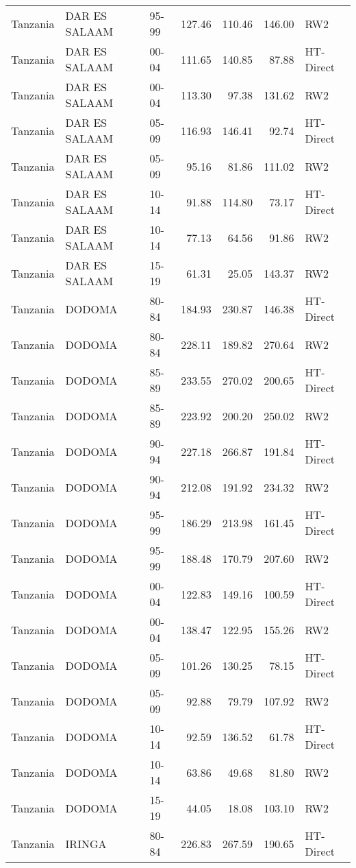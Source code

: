 \begin{longtable}{lllrrrl}
  Tanzania & DAR ES SALAAM & 95-99 & 127.46 & 110.46 & 146.00 & RW2 \\ 
  Tanzania & DAR ES SALAAM & 00-04 & 111.65 & 140.85 & 87.88 & HT-Direct \\ 
  Tanzania & DAR ES SALAAM & 00-04 & 113.30 & 97.38 & 131.62 & RW2 \\ 
  Tanzania & DAR ES SALAAM & 05-09 & 116.93 & 146.41 & 92.74 & HT-Direct \\ 
  Tanzania & DAR ES SALAAM & 05-09 & 95.16 & 81.86 & 111.02 & RW2 \\ 
  Tanzania & DAR ES SALAAM & 10-14 & 91.88 & 114.80 & 73.17 & HT-Direct \\ 
  Tanzania & DAR ES SALAAM & 10-14 & 77.13 & 64.56 & 91.86 & RW2 \\ 
  Tanzania & DAR ES SALAAM & 15-19 & 61.31 & 25.05 & 143.37 & RW2 \\ 
  Tanzania & DODOMA & 80-84 & 184.93 & 230.87 & 146.38 & HT-Direct \\ 
  Tanzania & DODOMA & 80-84 & 228.11 & 189.82 & 270.64 & RW2 \\ 
  Tanzania & DODOMA & 85-89 & 233.55 & 270.02 & 200.65 & HT-Direct \\ 
  Tanzania & DODOMA & 85-89 & 223.92 & 200.20 & 250.02 & RW2 \\ 
  Tanzania & DODOMA & 90-94 & 227.18 & 266.87 & 191.84 & HT-Direct \\ 
  Tanzania & DODOMA & 90-94 & 212.08 & 191.92 & 234.32 & RW2 \\ 
  Tanzania & DODOMA & 95-99 & 186.29 & 213.98 & 161.45 & HT-Direct \\ 
  Tanzania & DODOMA & 95-99 & 188.48 & 170.79 & 207.60 & RW2 \\ 
  Tanzania & DODOMA & 00-04 & 122.83 & 149.16 & 100.59 & HT-Direct \\ 
  Tanzania & DODOMA & 00-04 & 138.47 & 122.95 & 155.26 & RW2 \\ 
  Tanzania & DODOMA & 05-09 & 101.26 & 130.25 & 78.15 & HT-Direct \\ 
  Tanzania & DODOMA & 05-09 & 92.88 & 79.79 & 107.92 & RW2 \\ 
  Tanzania & DODOMA & 10-14 & 92.59 & 136.52 & 61.78 & HT-Direct \\ 
  Tanzania & DODOMA & 10-14 & 63.86 & 49.68 & 81.80 & RW2 \\ 
  Tanzania & DODOMA & 15-19 & 44.05 & 18.08 & 103.10 & RW2 \\ 
  Tanzania & IRINGA & 80-84 & 226.83 & 267.59 & 190.65 & HT-Direct \\ 

\end{longtable}
